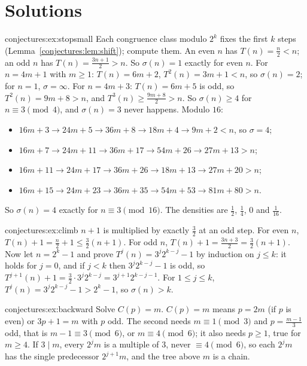 \section{Solutions}

\begin{solution}{conjectures:ex:stopsmall}
\idea Each congruence class modulo $2^k$ fixes the first $k$ steps (Lemma~\ref{conjectures:lem:shift}); compute them.
\writeup An even $n$ has $T(n)=\frac n2<n$; an odd $n$ has $T(n)=\frac{3n+1}2>n$. So $\sigma(n)=1$ exactly for even $n$. For $n=4m+1$ with $m\ge1$:
$T(n)=6m+2$, $T^2(n)=3m+1<n$, so $\sigma(n)=2$; for $n=1$, $\sigma=\infty$. For $n=4m+3$: $T(n)=6m+5$ is odd, so $T^2(n)=9m+8>n$, and $T^3(n)\ge\frac{9m+8}2>n$.
So $\sigma(n)\ge4$ for $n\equiv3\pmod4$, and $\sigma(n)=3$ never happens. Modulo $16$:
\begin{itemize}
\item $16m+3\to24m+5\to36m+8\to18m+4\to9m+2<n$, so $\sigma=4$;
\item $16m+7\to24m+11\to36m+17\to54m+26\to27m+13>n$;
\item $16m+11\to24m+17\to36m+26\to18m+13\to27m+20>n$;
\item $16m+15\to24m+23\to36m+35\to54m+53\to81m+80>n$.
\end{itemize}
So $\sigma(n)=4$ exactly for $n\equiv3\pmod{16}$. The densities are $\frac12$, $\frac14$, $0$ and $\frac1{16}$.
\end{solution}

\begin{solution}{conjectures:ex:climb}
\idea $n+1$ is multiplied by exactly $\frac32$ at an odd step.
\writeup For even $n$, $T(n)+1=\frac n2+1\le\frac32(n+1)$. For odd $n$, $T(n)+1=\frac{3n+3}2=\frac32(n+1)$. Now let $n=2^k-1$ and prove
$T^j(n)=3^j2^{k-j}-1$ by induction on $j\le k$: it holds for $j=0$, and if $j<k$ then $3^j2^{k-j}-1$ is odd, so
$T^{j+1}(n)+1=\frac32\cdot3^j2^{k-j}=3^{j+1}2^{k-j-1}$. For $1\le j\le k$, $T^j(n)=3^j2^{k-j}-1>2^k-1$, so $\sigma(n)>k$.
\end{solution}

\begin{solution}{conjectures:ex:backward}
\idea Solve $C(p)=m$.
\writeup $C(p)=m$ means $p=2m$ (if $p$ is even) or $3p+1=m$ with $p$ odd. The second needs $m\equiv1\pmod3$ and $p=\frac{m-1}3$ odd, that is
$m-1\equiv3\pmod6$, or $m\equiv4\pmod6$; it also needs $p\ge1$, true for $m\ge4$. If $3\mid m$, every $2^jm$ is a multiple of $3$, never
$\equiv4\pmod6$, so each $2^jm$ has the single predecessor $2^{j+1}m$, and the tree above $m$ is a chain.
\end{solution}

